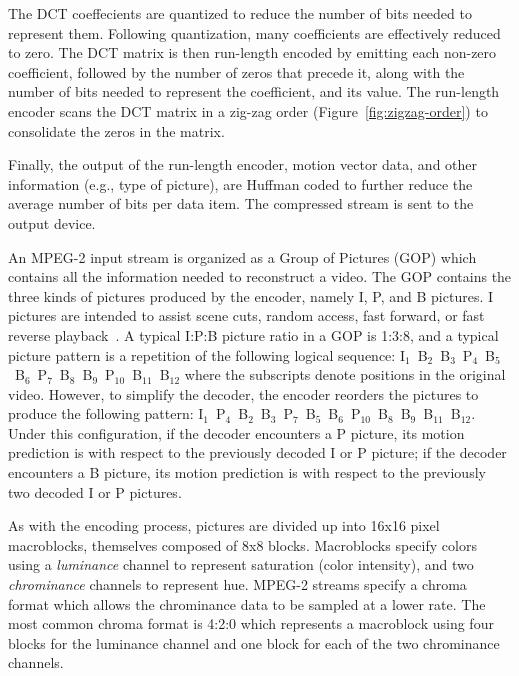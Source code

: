 The DCT coeffecients are quantized to reduce the number of bits needed
to represent them. Following quantization, many coefficients are
effectively reduced to zero. The DCT matrix is then run-length encoded
by emitting each non-zero coefficient,
followed by the number of zeros that precede it, along with the number
of bits needed to represent the coefficient, and its value. The
run-length encoder scans the DCT matrix in a zig-zag order
(Figure~\ref{fig:zigzag-order}) to consolidate the zeros in the matrix.

Finally, the output of the run-length encoder, motion vector data,
and other information (e.g., type of picture), are Huffman coded to
further reduce the average number of bits per data item. The compressed
stream is sent to the output device.


An MPEG-2 input stream is organized as a Group of Pictures (GOP) which
contains all the information needed to reconstruct a video. The GOP
contains the three kinds of pictures produced by the encoder, namely
I, P, and B pictures. I pictures are intended to assist scene cuts,
random access, fast forward, or fast reverse
playback~\cite[p. 14]{MPEG2}. A typical I:P:B picture ratio in a GOP
is 1:3:8, and a typical picture pattern is a repetition of the
following logical sequence:
I$_1$~B$_2$~B$_3$~P$_4$~B$_5$~B$_6$~P$_7$~B$_8$~B$_9$~P$_{10}$~B$_{11}$~B$_{12}$
where the subscripts denote positions in the original video.  However,
to simplify the decoder, the encoder reorders the pictures to produce
the following pattern:
I$_1$~P$_4$~B$_2$~B$_3$~P$_7$~B$_5$~B$_6$~P$_{10}$~B$_8$~B$_9$~B$_{11}$~B$_{12}$.
Under this configuration, if the decoder encounters a P picture, its
motion prediction is with respect to the previously decoded I or P
picture; if the decoder encounters a B picture, its motion prediction
is with respect to the previously two decoded I or P pictures.

As with the encoding process, pictures are divided up into 16x16 pixel
macroblocks, themselves composed of 8x8 blocks. Macroblocks
specify colors using a {\it luminance} channel to represent saturation
(color intensity), and two {\it chrominance} channels to represent
hue. MPEG-2 streams specify a chroma format which allows the
chrominance data to be sampled at a lower rate. The most common chroma
format is 4:2:0 which represents a macroblock using four blocks for the
luminance channel and one block for each of the two chrominance
channels.

